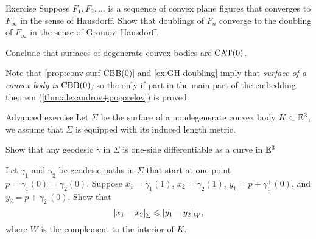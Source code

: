 \begin{thm}{Exercise}\label{ex:GH-doubling}
Suppose $F_1,F_2,\dots$ is a sequence of convex plane figures that converges to $F_\infty$ in the sense of Hausdorff.
Show that doublings of $F_n$ converge to the doubling of $F_\infty$ in the sense of Gromov--Hausdorff.

Conclude that surfaces of degenerate convex bodies are $\mathrm{CAT}(0)$.
\end{thm}

Note that \ref{prop:conv-surf-CBB(0)} and \ref{ex:GH-doubling} imply that
\textit{surface of a convex body is $\mathrm{CBB}(0)$;}
so the only-if part in the main part of the embedding theorem (\ref{thm:alexandrov+pogorelov}) is proved.

\begin{thm}{Advanced exercise}\label{ex:mklka}
Let $\Sigma$ be the surface of a nondegenerate convex body $K\subset\mathbb{E}^3$;
we assume that $\Sigma$ is equipped with its induced length metric.

\begin{subthm}
Show that any geodesic $\gamma$ in $\Sigma$ is one-side differentiable as a curve in $\mathbb{E}^3$ 
\end{subthm}

\begin{subthm}
Let $\gamma_1$ and $\gamma_2$ be geodesic paths in $\Sigma$ that start at one point $p=\gamma_1(0)=\gamma_2(0)$.
Suppose $x_1=\gamma_1(1)$, $x_2=\gamma_2(1)$, $y_1=p+\gamma_1^+(0)$, and $y_2=p+\gamma_2^+(0)$.
Show that 
\[\dist{x_1}{x_2}{\Sigma}\le \dist{y_1}{y_2}{W},\]
where $W$ is the complement to the interior of $K$.
\end{subthm}


\end{thm}

